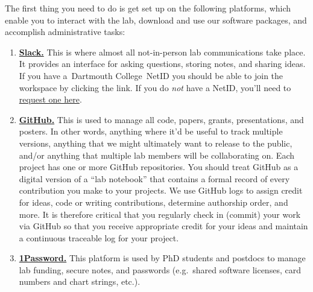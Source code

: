 \documentclass{tufte-book} %
\newcommand{\ourschool}{Dartmouth College}
\begin{document}

\noindent
The first thing you need to do is get set up on the following
platforms, which enable you to interact with the lab,
download and use our software packages, and accomplish
administrative tasks: 
\begin{enumerate}
\item \href{https://context-lab.slack.com}{\textbf{Slack.}}  This is where
  almost all not-in-person lab communications take place.  It provides
  an interface for asking questions, storing notes, and sharing
  ideas.  If you have a~\ourschool~NetID you should be able to join the workspace by clicking the link.
  If you do \textit{not} have a NetID, you'll need to \href{https://services.dartmouth.edu/TDClient/1806/Portal/Requests/ServiceDet?ID=30581}{request one here}.

\item \href{https://www.github.com}{\textbf{GitHub.}}
    This is used
  to manage all code, papers, grants, presentations, and posters.  In
  other words, anything where it'd be useful to track multiple
  versions, anything that we might ultimately want to release to the
  public, and/or anything that multiple lab members will be
  collaborating on.  Each project has one or more GitHub repositories.  You should treat GitHub as a digital version of a ``lab notebook''
  that contains a formal record of every contribution you make to your projects.  We use GitHub logs to assign credit for ideas, code or writing contributions,
  determine authorship order, and more.  It is therefore critical that you regularly check in (commit) your work via GitHub so that you receive appropriate credit for your
  ideas and maintain a continuous traceable log for your project.
\item \href{https://1password.com/}{\textbf{1Password.}}
   This platform is used by PhD students and postdocs to manage lab funding, secure notes, and passwords (e.g.\ shared
  software licenses, card numbers and chart strings, etc.).

\end{enumerate}
\end{document}
